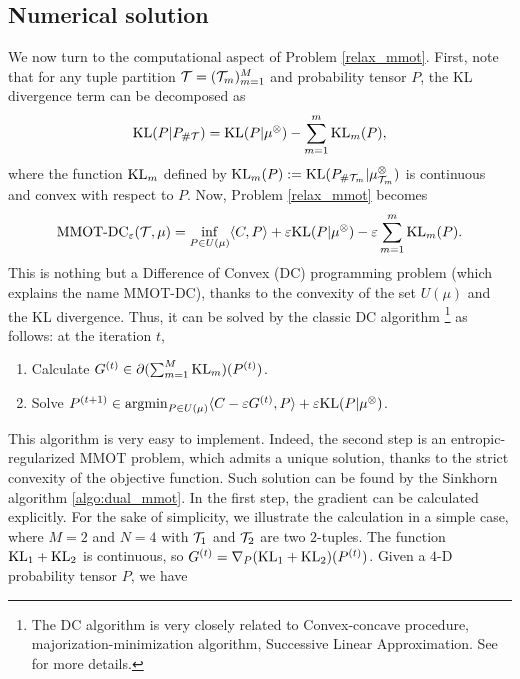 \subsection{Numerical solution} \label{sec:algo}
We now turn to the computational aspect of Problem \eqref{relax_mmot}. First, note that for any tuple partition
$\mathcal T = (\mathcal T_m)_{m=1}^M$ and probability tensor $P$, the KL divergence term can be decomposed as
\begin{equation}
  \text{KL}(P \vert P_{\# \mathcal T}) = \text{KL}(P | \mu^{\otimes}) - \sum_{m=1}^m \text{KL}_m(P),
\end{equation}
where the function $\text{KL}_m$ defined by $\text{KL}_m(P) := \text{KL}(P_{\# \mathcal T_m} | \mu^{\otimes}_{\mathcal T_m})$
is continuous and convex with respect to $P$. Now, Problem \eqref{relax_mmot} becomes
\begin{equation} \label{relax}
  \text{MMOT-DC}_{\varepsilon}(\mathcal T, \mu) = \inf_{P \in U(\mu)}
  \langle C, P \rangle + \varepsilon \text{KL}(P | \mu^{\otimes}) - \varepsilon \sum_{m=1}^m \text{KL}_m(P).
\end{equation}
This is nothing but a Difference of Convex (DC) programming problem (which explains the name MMOT-DC),
thanks to the convexity of the set $U(\mu)$ and the KL divergence. Thus, it can be solved
by the classic DC algorithm
\footnote{The DC algorithm is very closely related to Convex-concave procedure,
majorization-minimization algorithm, Successive Linear
Approximation. See \citep{Le18} for more details.} \citep{Tao86,Tao97} as follows:
at the iteration $t$,
\begin{enumerate}
  \item Calculate $G^{(t)} \in \partial(\sum_{m=1}^M \text{KL}_m)(P^{(t)})$.
  \item Solve $P^{(t+1)} \in \operatorname*{argmin}_{P \in U(\mu)} \langle C -
  \varepsilon G^{(t)}, P \rangle + \varepsilon \text{KL}(P | \mu^{\otimes})$.
\end{enumerate}
This algorithm is very easy to implement. Indeed, the second step is an entropic-regularized MMOT problem, which admits a unique
solution, thanks to the strict convexity of the objective function.
Such solution can be found by the Sinkhorn algorithm
\ref{algo:dual_mmot}. In the first step, the gradient can be calculated explicitly.
For the sake of simplicity, we illustrate the calculation in a simple case, where $M=2$ and $N=4$ with
$\mathcal T_1$ and $\mathcal T_2$ are two $2$-tuples. The function $\text{KL}_1 + \text{KL}_2$ is continuous, so
$G^{(t)} = \nabla_P (\text{KL}_1 + \text{KL}_2)(P^{(t)})$. Given a $4$-D probability tensor $P$, we have
